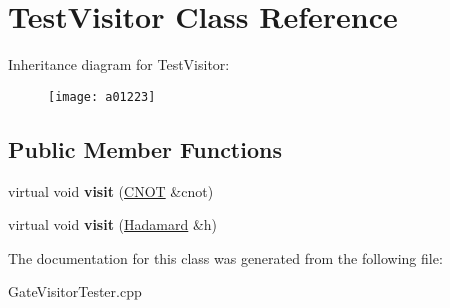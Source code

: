 \hypertarget{a01223}{}\section{Test\+Visitor Class Reference}
\label{a01223}
Inheritance diagram for Test\+Visitor\+:\begin{figure}[H]
\begin{center}
\leavevmode
\texttt{[image: a01223]}
\end{center}
\end{figure}
\subsection*{Public Member Functions}
\begin{DoxyCompactItemize}
\item 
\mbox{\label{a01223_a2766c0664632ae33300eb9e663a26005}} 
virtual void {\bfseries visit} (\hyperlink{a01175}{C\+N\+OT} \&cnot)
\item 
\mbox{\label{a01223_a0a0f77d3f19f9bda449318a52031f2d4}} 
virtual void {\bfseries visit} (\hyperlink{a01187}{Hadamard} \&h)
\end{DoxyCompactItemize}


The documentation for this class was generated from the following file\+:\begin{DoxyCompactItemize}
\item 
Gate\+Visitor\+Tester.\+cpp\end{DoxyCompactItemize}
